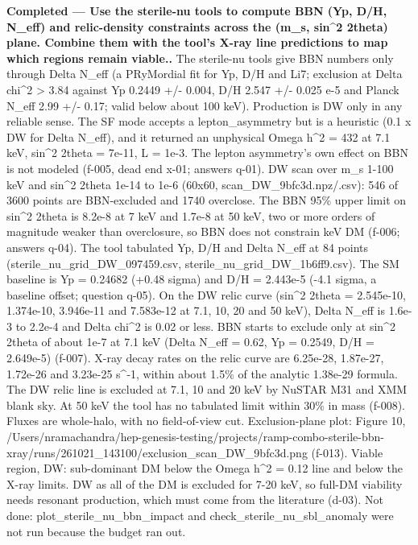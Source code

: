 \documentclass[11pt,a4paper]{article}
\begin{document}
\textbf{Completed --- Use the sterile-nu tools to compute BBN (Yp, D/H, N\_eff) and relic-density constraints across the (m\_s, sin\textasciicircum{}2 2theta) plane. Combine them with the tool's X-ray line predictions to map which regions remain viable..} The sterile-nu tools give BBN numbers only through Delta N\_eff (a PRyMordial fit for Yp, D/H and Li7; exclusion at Delta chi\textasciicircum{}2 \textgreater{} 3.84 against Yp 0.2449 +/- 0.004, D/H 2.547 +/- 0.025 e-5 and Planck N\_eff 2.99 +/- 0.17; valid below about 100 keV). Production is DW only in any reliable sense. The SF mode accepts a lepton\_asymmetry but is a heuristic (0.1 x DW for Delta N\_eff), and it returned an unphysical Omega h\textasciicircum{}2 = 432 at 7.1 keV, sin\textasciicircum{}2 2theta = 7e-11, L = 1e-3. The lepton asymmetry's own effect on BBN is not modeled (f-005, dead end x-01; answers q-01). DW scan over m\_s 1-100 keV and sin\textasciicircum{}2 2theta 1e-14 to 1e-6 (60x60, scan\_DW\_9bfc3d.npz/.csv): 546 of 3600 points are BBN-excluded and 1740 overclose. The BBN 95\% upper limit on sin\textasciicircum{}2 2theta is 8.2e-8 at 7 keV and 1.7e-8 at 50 keV, two or more orders of magnitude weaker than overclosure, so BBN does not constrain keV DM (f-006; answers q-04). The tool tabulated Yp, D/H and Delta N\_eff at 84 points (sterile\_nu\_grid\_DW\_097459.csv, sterile\_nu\_grid\_DW\_1b6ff9.csv). The SM baseline is Yp = 0.24682 (+0.48 sigma) and D/H = 2.443e-5 (-4.1 sigma, a baseline offset; question q-05). On the DW relic curve (sin\textasciicircum{}2 2theta = 2.545e-10, 1.374e-10, 3.946e-11 and 7.583e-12 at 7.1, 10, 20 and 50 keV), Delta N\_eff is 1.6e-3 to 2.2e-4 and \textbar{}Delta chi\textasciicircum{}2\textbar{} is 0.02 or less. BBN starts to exclude only at sin\textasciicircum{}2 2theta of about 1e-7 at 7.1 keV (Delta N\_eff = 0.62, Yp = 0.2549, D/H = 2.649e-5) (f-007). X-ray decay rates on the relic curve are 6.25e-28, 1.87e-27, 1.72e-26 and 3.23e-25 s\textasciicircum{}-1, within about 1.5\% of the analytic 1.38e-29 formula. The DW relic line is excluded at 7.1, 10 and 20 keV by NuSTAR M31 and XMM blank sky. At 50 keV the tool has no tabulated limit within 30\% in mass (f-008). Fluxes are whole-halo, with no field-of-view cut. Exclusion-plane plot: Figure 10, /Users/nramachandra/hep-genesis-testing/projects/ramp-combo-sterile-bbn-xray/runs/261021\_143100/exclusion\_scan\_DW\_9bfc3d.png (f-013). Viable region, DW: sub-dominant DM below the Omega h\textasciicircum{}2 = 0.12 line and below the X-ray limits. DW as all of the DM is excluded for 7-20 keV, so full-DM viability needs resonant production, which must come from the literature (d-03). Not done: plot\_sterile\_nu\_bbn\_impact and check\_sterile\_nu\_sbl\_anomaly were not run because the budget ran out.
\end{document}
